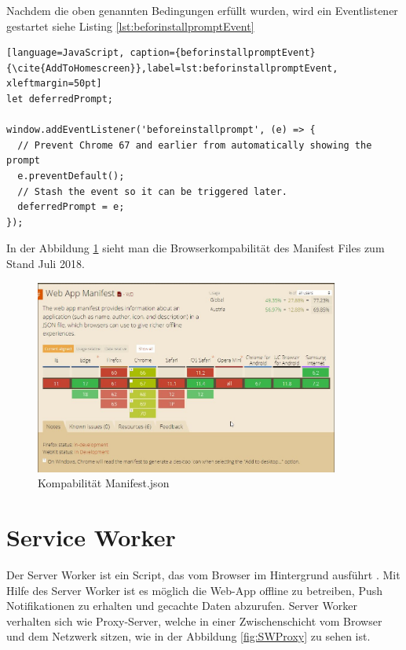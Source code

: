 Nachdem die oben genannten Bedingungen erfüllt wurden, wird ein Eventlistener gestartet siehe Listing \ref{lst:beforinstallpromptEvent}


\begin{lstlisting}[language=JavaScript, caption={beforinstallpromptEvent} {\cite{AddToHomescreen}},label=lst:beforinstallpromptEvent, xleftmargin=50pt]
let deferredPrompt;

window.addEventListener('beforeinstallprompt', (e) => {
  // Prevent Chrome 67 and earlier from automatically showing the prompt
  e.preventDefault();
  // Stash the event so it can be triggered later.
  deferredPrompt = e;
});
\end{lstlisting}

In der Abbildung \ref{fig:BrowserManifest} sieht man die Browserkompabilität des Manifest Files zum Stand Juli 2018.
 
\begin{figure}[H]
	\centering
	\includegraphics[width=10cm]{BilderAllgemein/BrowserManifest}\medskip
	\caption{Kompabilität Manifest.json \cite{BrowserSupport}}
	\label{fig:BrowserManifest}
\end{figure}
 


\section{Service Worker}\label{sub:ServiceWorker}
Der Server Worker ist ein Script, das vom Browser im Hintergrund ausführt \cite{ServiceWorkerRegistration}. Mit Hilfe des Server Worker ist es möglich die \acs{Web-App} offline zu betreiben, Push Notifikationen zu erhalten und gecachte Daten abzurufen. Server Worker verhalten sich wie Proxy-Server, welche in einer Zwischenschicht vom Browser und dem Netzwerk sitzen, wie in der Abbildung \ref{fig:SWProxy} zu sehen ist.

